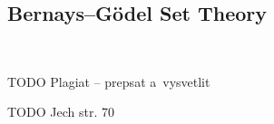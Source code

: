 \documentclass[12pt,a4paper]{article}
\newtheorem{definition}[theorem]{Definition}
\renewcommand{\iff}{\leftrightarrow}
\newcommand{\then}{\rightarrow}
\newcommand{\bce}{\begin{compactenum}}
\begin{document}
\subsection{Bernays–G{\"o}del Set Theory}

\

TODO Plagiat -- prepsat a~vysvetlit

TODO Jech str. 70 \cite{JechBook}

{\color{red}
\begin{comment}

G{\"o}del–Bernays set theory, also known as Von Neumann–Bernays–G{\"o}del set theory is an axiomatic set theory that 
explicitly talks about proper classes as well as sets, which allows it to be finitely axiomatizable, albeit our version stated below contains one schema. It is a~conservative extension of Zermalo–Fraenkel set theory. Using forcing, one can prove equiconsistency of BGC and ZFC.
\newline
 
Bernays–G{\"o}del set theory contains two types of objects: proper classes and sets. The notion of set, usually denoted by a~lower case letter, is identical to set in ZF, whereas proper classes are usually denoted by upper case letters. The difference between the two is in a~fact, that 
proper classes are not members of other classes, sets, on the other hand, have to be members of classes.
\begin{definition}(G{\"o}del–Bernay set theory)
\bce[(i)]
\item \emph{extensionality for sets}
\begin{equation}
\forall a \forall b [\forall x(x \in a~\iff x \in b) \then a = b]
\end{equation}
\item \emph{pairing for sets}
\begin{equation}
\forall x \forall y \exists z \forall w [w \in z \iff (w = x \lor w = y)]
\end{equation}
\item \emph{union for sets}
\begin{equation}
\forall a \exists b \forall c [c \in b \iff \exists d ( c \in d \land d \in a)]
\end{equation}
\item \emph{powers for sets}
\begin{equation}
\forall a \exists p \forall b [b \in p \iff (c \in b \then c \in a)]
\end{equation}
\item \emph{infinity for sets}
\begin{equation}
\mbox{There is an inductive set.}
\end{equation}
\item \emph{Extensionality for classes}
\begin{equation}
\forall x (x \in A \iff x \in B) \then A = B
\end{equation}


\end{comment}}
\end{document}
